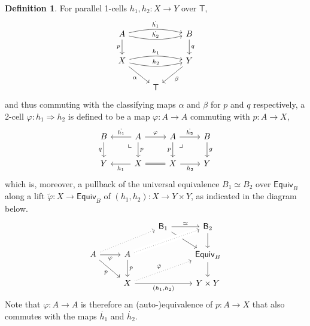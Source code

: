 \documentclass[12pt,reqno]{amsart}
\renewcommand{\to}{\ensuremath{\rightarrow}}
\newcommand{\T}{\ensuremath{\mathsf{T}}}
\newcommand{\pbcorner}{\arrow[dr,phantom,"\lrcorner" very near start, shift right=.5ex]} %
\newcommand{\pbcornerright}{\arrow[dl,phantom,"\llcorner" very near start, shift left=.5ex]} %
\theoremstyle{remark}
\theoremstyle{definition}
\newtheorem{definition}[theorem]{Definition}
\begin{document}
%
\begin{definition}\label{def:2cells}%
For parallel 1-cells $h_1, h_2 : X \to Y$ over $\T$,
\begin{equation}\label{eq:parallelclassifiedfamilies}
\begin{tikzcd}
	 A \ar[d,swap, "p"] \ar[rr,bend right = 3ex, "{\dot{h_2}}"]  \ar[rr,bend left  = 3ex, "{\dot{h_1}}"]  && B \ar[d, "q"] \\  
	 X \ar[rr,swap,bend right = 3ex,swap, "{h_2}"] \ar[rr,bend left  = 3ex, "{h_1}"]  \ar[rd,swap, "\alpha"] &&  \ar[ld, "\beta"]  Y\\
	&\T&
 \end{tikzcd}
 \end{equation}
and thus commuting with the classifying maps $\alpha$ and $\beta$ for $p$ and $q$ respectively, a 2-cell $\varphi : h_1 \Rightarrow h_2$ is defined to be a map $\varphi : A\to A$ commuting with $p : A \to X$,
\begin{equation}\label{eq:parallelclassifiedfamilies2}
\begin{tikzcd}
 B  \ar[d,swap, "q"] &  \ar[l,swap, "{\dot{h_1}}"] A \ar[r, "{\varphi}"] \ar[d, "p"] \pbcornerright & A \ar[d, swap, "p"]  \ar[r, "{\dot{h_2}}"]   \pbcorner & B \ar[d, "g"] \\  
 Y &  \ar[l, "{h_1}"]  X \ar[r, equals] & X \ar[r,swap, "{h_2}"] &  Y
 \end{tikzcd}
 \end{equation}
which is, moreover, a pullback of the universal equivalence $B_1\simeq B_2$ over $\mathsf{Equiv}_B$ along a lift $\tilde{\varphi} : X \to \mathsf{Equiv}_B$ of  $(h_1, h_2) : X \to Y \times Y$, as indicated in the diagram below.
\begin{equation}\label{diag:2celldef3}
\begin{tikzcd} 
	&& \mathsf{B}_1 \ar[rd]  \ar[r,"{\simeq}"]  & \mathsf{B}_2 \ar[d] \\  
A \ar[rd,swap, "p"] \ar[r,swap, "{\varphi}"]  \ar[rru, dotted] & A \ar[d, "p"] \ar[rru, crossing over, dotted] && \mathsf{Equiv}_B \ar[d] \\  
& X \ar[rru, dotted, "{\tilde{\varphi}}"] \ar[rr, swap, "{(h_1, h_2)}"] && Y \times Y
	 \end{tikzcd}
 \end{equation}
 Note that $\varphi : A \to A$ is therefore an (auto-)equivalence of $p :A\to X$ that  also commutes with the maps $\dot{h_1}$ and $\dot{h_2}$.  
\end{definition}
\end{document}
